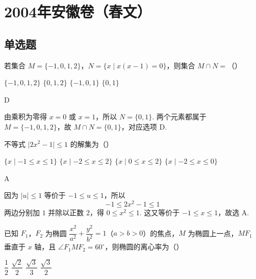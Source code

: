 \chapter{2004年安徽卷（春文）}

\section{单选题}

\begin{problem}
若集合 \(M=\{-1,0,1,2\}\)，\(N=\{x\mid x(x-1)=0\}\)，则集合 \(M\cap N=\)（\quad）

\choices
    {\(\{-1,0,1,2\}\)}
    {\(\{0,1,2\}\)}
    {\(\{-1,0,1\}\)}
    {\(\{0,1\}\)}
\end{problem}

\begin{answer}
D
\end{answer}

\begin{solution}
由乘积为零得 \(x=0\) 或 \(x=1\)，所以 \(N=\{0,1\}\). 两个元素都属于 \(M=\{-1,0,1,2\}\)，故
\(M\cap N=\{0,1\}\)，对应选项 D.
\end{solution}

\begin{problem}
不等式 \(\lvert 2x^{2}-1\rvert\leqslant1\) 的解集为（\quad）

\choices
    {\(\{x\mid -1\leqslant x\leqslant1\}\)}
    {\(\{x\mid -2\leqslant x\leqslant2\}\)}
    {\(\{x\mid 0\leqslant x\leqslant2\}\)}
    {\(\{x\mid -2\leqslant x\leqslant0\}\)}
\end{problem}

\begin{answer}
A
\end{answer}

\begin{solution}
因为 \(\lvert u\rvert\leqslant1\) 等价于 \(-1\leqslant u\leqslant1\)，所以
\[
-1\leqslant2x^{2}-1\leqslant1
\]
两边分别加 \(1\) 并除以正数 \(2\)，得 \(0\leqslant x^{2}\leqslant1\). 这又等价于 \(-1\leqslant x\leqslant1\)，故选 A.
\end{solution}

\begin{problem}
已知 \(F_{1}\)，\(F_{2}\) 为椭圆 \(\dfrac{x^{2}}{a^{2}}+\dfrac{y^{2}}{b^{2}}=1\)（\(a>b>0\)）的焦点，\(M\) 为椭圆上一点，\(MF_{1}\) 垂直于 \(x\) 轴，且 \(\angle F_{1}MF_{2}=60^{\circ}\)，则椭圆的离心率为（\quad）

\choices
    {\(\dfrac{1}{2}\)}
    {\(\dfrac{\sqrt{2}}{2}\)}
    {\(\dfrac{\sqrt{3}}{3}\)}
    {\(\dfrac{\sqrt{3}}{2}\)}
\end{problem}

